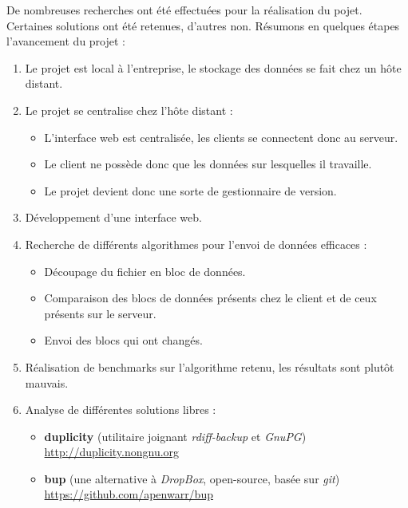 De nombreuses recherches ont été effectuées pour la réalisation du pojet. Certaines solutions ont été retenues, d'autres non.
Résumons en quelques étapes l'avancement du projet :

\begin{enumerate}
     \item Le projet est local à l'entreprise, le stockage des données se fait chez un hôte distant.
     \item Le projet se centralise chez l'hôte distant :
     \begin{itemize}
          \item L'interface web est centralisée, les clients se connectent donc au serveur.
          \item Le client ne possède donc que les données sur lesquelles il travaille.
          \item Le projet devient donc une sorte de gestionnaire de version.
     \end{itemize}

     \item Développement d'une interface web.

     \item Recherche de différents algorithmes pour l'envoi de données efficaces :
     \begin{itemize}
          \item Découpage du fichier en bloc de données.
          \item Comparaison des blocs de données présents chez le client et de ceux présents sur le serveur.
          \item Envoi des blocs qui ont changés.
     \end{itemize}

     \item Réalisation de benchmarks sur l'algorithme retenu, les résultats sont plutôt mauvais.
     \item Analyse de différentes solutions libres :
     \begin{itemize}
          \item \textbf{duplicity} (utilitaire joignant \textit{rdiff-backup} et \textit{GnuPG}) \url{http://duplicity.nongnu.org}
          \item \textbf{bup} (une alternative à \textit{DropBox}, open-source, basée sur \textit{git}) \url{https://github.com/apenwarr/bup}
     \end{itemize}
\end{enumerate}


